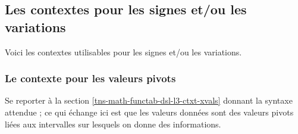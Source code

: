 \documentclass[12pt, a4paper]{article}
\begin{document}

\subsection{Les contextes pour les signes et/ou les variations}

Voici les contextes utilisables pour les signes et/ou les variations.

\medskip

\begin{itemize*}[before = \leavevmode\kern15pt, itemjoin = \kern15pt]
	\item {}

	\item {}

	\item {}
\end{itemize*}




\subsubsection{Le contexte  pour les valeurs pivots}

Se reporter à la section \ref{tns-math-functab-dsl-l3-ctxt-xvals} donnant la syntaxe attendue ; ce qui échange ici est que les valeurs données sont des valeurs pivots liées aux intervalles sur lesquels on donne des informations.
\end{document}
